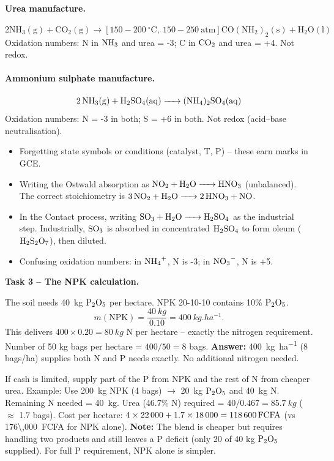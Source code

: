 \documentclass[11pt]{article}
\newcommand{\cle}[1]{{\popxbold\color{popdark}#1}}
\begin{document}
\paragraph{Urea manufacture.}
\[ \ensuremath{\mathrm{2NH_{3}(g) + CO_{2}(g) \rightarrow [150-200\ ^{\circ}C,\ 150-250\ atm] CO(NH_{2})_{2}(s) + H_{2}O(l)}} \]
Oxidation numbers: N in $\ce{NH3}$ and urea = -3; C in $\ce{CO2}$ and urea = +4. \cle{Not redox}.

\paragraph{Ammonium sulphate manufacture.}
\[ \ce{2NH3(g) + H2SO4(aq) -> (NH4)2SO4(aq)} \]
Oxidation numbers: N = -3 in both; S = +6 in both. \cle{Not redox} (acid--base neutralisation).

\begin{attention}
\begin{itemize}
\item Forgetting state symbols or conditions (catalyst, T, P) -- these earn marks in GCE.
\item Writing the Ostwald absorption as $\ce{NO2 + H2O -> HNO3}$ (unbalanced). The correct stoichiometry is $\ce{3NO2 + H2O -> 2HNO3 + NO}$.
\item In the Contact process, writing $\ce{SO3 + H2O -> H2SO4}$ as the industrial step. Industrially, $\ce{SO3}$ is absorbed in concentrated $\ce{H2SO4}$ to form oleum ($\ce{H2S2O7}$), then diluted.
\item Confusing oxidation numbers: in $\ce{NH4+}$, N is -3; in $\ce{NO3-}$, N is +5.
\end{itemize}
\end{attention}

\textbf{Task 3 -- The NPK calculation.}

\begin{exoresolu}
The soil needs \SI{40}{kg} $\ce{P2O5}$ per hectare. NPK 20-10-10 contains 10\% $\ce{P2O5}$.
\[ m(\text{NPK}) = \frac{\SI{40}{kg}}{0.10} = \SI{400}{kg.ha^{-1}}. \]
This delivers $400 \times 0.20 = \SI{80}{kg}$ N per hectare -- exactly the nitrogen requirement.
Number of 50 kg bags per hectare = $400 / 50 = 8$ bags.
\tcblower
\textbf{Answer:} \SI{400}{kg.ha^{-1}} (8 bags/ha) supplies both N and P needs exactly. No additional nitrogen needed.
\end{exoresolu}

\begin{exoresolu}
If cash is limited, supply part of the P from NPK and the rest of N from cheaper urea.
Example: Use \SI{200}{kg} NPK (4 bags) $\to$ \SI{20}{kg} $\ce{P2O5}$ and \SI{40}{kg} N.
Remaining N needed = \SI{40}{kg}. Urea (46.7\% N) required = $40 / 0.467 = \SI{85.7}{kg}$ ($\approx$ 1.7 bags).
Cost per hectare: $4 \times 22\,000 + 1.7 \times 18\,000 = \SI{118\,600}{FCFA}$ (vs \SI{176\,000}{FCFA} for NPK alone).
\tcblower
\textbf{Note:} The blend is cheaper but requires handling two products and still leaves a P deficit (only 20 of 40 kg $\ce{P2O5}$ supplied). For full P requirement, NPK alone is simpler.
\end{exoresolu}
\end{document}
